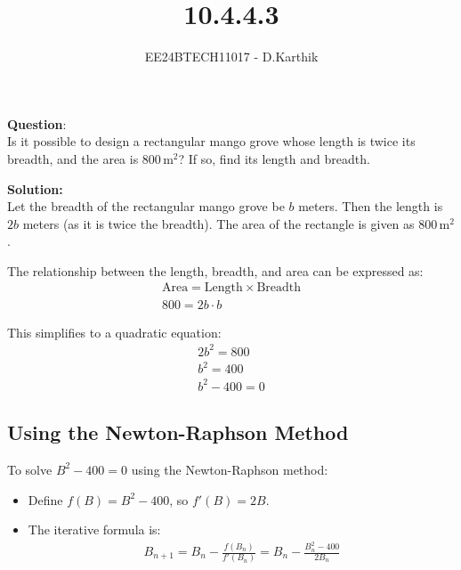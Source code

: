 \documentclass[journal]{IEEEtran}
\begin{document}

\vspace{3cm}

\title{10.4.4.3}
\author{EE24BTECH11017 - D.Karthik}
 \maketitle
{\let\newpage\relax\maketitle}

\renewcommand{\thefigure}{\theenumi}
\renewcommand{\thetable}{\theenumi}
\setlength{\intextsep}{10pt} %


\renewcommand{\thetable}{\theenumi}


\textbf{Question}:\\
Is it possible to design a rectangular mango grove whose length is twice its breadth, and the area is $800\, \text{m}^2$? If so, find its length and breadth.

\textbf{Solution:}\\
Let the breadth of the rectangular mango grove be $b$ meters. Then the length is $2b$ meters (as it is twice the breadth). The area of the rectangle is given as $800\, \text{m}^2$.

The relationship between the length, breadth, and area can be expressed as:
\begin{align}
    \text{Area} = \text{Length} \times \text{Breadth} \\
    800 = 2b \cdot b
\end{align}

This simplifies to a quadratic equation:
\begin{align}
    2b^2 = 800 \\
    b^2 = 400 \\
    b^2 - 400 = 0
\end{align}


\subsection*{Using the Newton-Raphson Method}
To solve \( B^2 - 400 = 0 \) using the Newton-Raphson method:
\begin{itemize}
    \item Define \( f(B) = B^2 - 400 \), so \( f'(B) = 2B \).
    \item The iterative formula is:
    \begin{align}
        B_{n+1} = B_n - \frac{f(B_n)}{f'(B_n)} = B_n - \frac{B_n^2 - 400}{2B_n}
    \end{align}
\end{itemize}
\end{document}
